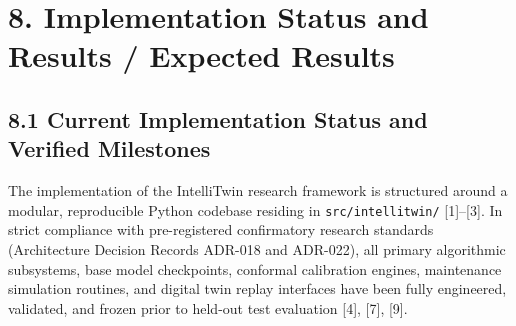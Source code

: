 \documentclass[12pt,a4paper]{article}
\begin{document}
\section*{8. Implementation Status and Results / Expected Results}

\subsection*{8.1 Current Implementation Status and Verified Milestones}
The implementation of the IntelliTwin research framework is structured around a modular, reproducible Python codebase residing in \texttt{src/intellitwin/} [1]--[3]. In strict compliance with pre-registered confirmatory research standards (Architecture Decision Records ADR-018 and ADR-022), all primary algorithmic subsystems, base model checkpoints, conformal calibration engines, maintenance simulation routines, and digital twin replay interfaces have been fully engineered, validated, and frozen prior to held-out test evaluation [4], [7], [9].
\end{document}
